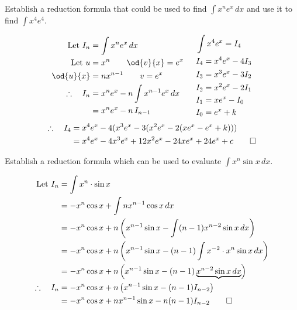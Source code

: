 	\begin{example}
		Establish a reduction formula that could be used to find $\int x^ne^x \, dx$ and use it to find $\int x^4e^4$.
	\end{example}
	
	\begin{equation*}
		\begin{split}
			\text{Let } I_n &= \int x^ne^x \, dx \\
			\text{Let } u 	&= x^n    \qquad   \od{v}{x} = e^x \\
			\od{u}{x}     	&= nx^{n-1} \qquad  v = e^x         \\
			\therefore \quad I_n	&= x^ne^x - n \int x^{n-1}e^x \, dx\qquad\\
			&= x^ne^x - n\, I_{n-1}
		\end{split}
		\begin{split}
			&\int x^4e^x = I_4\\
			&I_4 = x^4e^x - 4I_3\\
			&I_3 = x^3e^x - 3I_2\\
			&I_2 = x^2e^x - 2I_1\\		
			&I_1 = xe^x - I_0\\				 		 	
			&I_0 = e^x + k
		\end{split}
	\end{equation*}
	\begin{align*}
		\therefore \quad I_4 & = x^4e^x -4(x^3e^x - 3(x^2e^x - 2(xe^x - e^x + k))) \\
		& = x^4e^x -4x^3e^x + 12x^2e^x - 24xe^x + 24e^x + c   \qed
	\end{align*}
		\hrulefill
	\begin{example}
		Establish a reduction formula which can be used to evaluate $\int x^n \sin x \, dx$.
	\end{example}
	
	\begin{align*}
		\text{Let } I_n &= \int x^n \cdot \sin x\\
						&= -x^n\cos x + \int nx^{n-1}\cos x\,dx\\
						&= -x^n\cos x + n\left(x^{n-1}\sin x - \int (n-1)x^{n-2}\sin x\,dx\right)\\
						&= -x^n\cos x + n\left(x^{n-1}\sin x - (n-1) \int x^{-2} \cdot x^n\sin x\,dx\right)\\
						&= -x^n\cos x + n\left(x^{n-1}\sin x - (n-1) \underbrace{x^{n-2}\sin x\,dx}\right)\\
						\therefore \quad I_n &= -x^n\cos x + n\left(x^{n-1}\sin x - (n-1)I_{n-2}\right)\\
						&= -x^n\cos x + nx^{n-1}\sin x - n(n-1)I_{n-2} \qed
	\end{align*}
	\hrulefill\newpage
	
